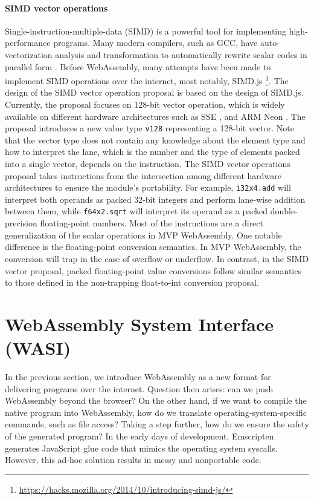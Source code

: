 \paragraph{SIMD vector operations}
Single-instruction-multiple-data (SIMD) is a powerful tool for implementing
high-performance programs. Many modern compilers, such as GCC, have
auto-vectorization analysis and transformation to automatically rewrite scalar
codes in parallel form \cite{auto-vec-gcc}. Before WebAssembly, many attempts
have been made to implement SIMD operations over the internet, most notably,
SIMD.js \footnote{\url{https://hacks.mozilla.org/2014/10/introducing-simd-js/}}.
The design of the SIMD vector operation proposal is based on the design of
SIMD.js. Currently, the proposal focuses on 128-bit vector operation, which is
widely available on different hardware architectures such as SSE
\cite{sse-intel}, and ARM Neon \cite{arm-neon}. The proposal introduces a new
value type \texttt{v128} representing a 128-bit vector. Note that the vector
type does not contain any knowledge about the element type and how to interpret
the lane, which is the number and the type of elements packed into a single
vector, depends on the instruction. The SIMD vector operations proposal takes
instructions from the intersection among different hardware architectures to
ensure the module's portability. For example, \texttt{i32x4.add} will interpret
both operands as packed 32-bit integers and perform lane-wise addition between
them, while \texttt{f64x2.sqrt} will interpret its operand as a packed
double-precision floating-point numbers. Most of the instructions are a direct
generalization of the scalar operations in MVP WebAssembly. One notable
difference is the floating-point conversion semantics. In MVP WebAssembly, the
conversion will trap in the case of overflow or underflow. In contrast, in the
SIMD vector proposal, packed floating-point value conversions follow similar
semantics to those defined in the non-trapping float-to-int conversion proposal.

\section{WebAssembly System Interface (WASI)}

In the previous section, we introduce WebAssembly as a new format for delivering
programs over the internet. Question then arises: can we push WebAssembly beyond
the browser? On the other hand, if we want to compile the native program into
WebAssembly, how do we translate operating-system-specific commands, such as
file access? Taking a step further, how do we ensure the safety of the generated
program? In the early days of development, Emscripten generates JavaScript glue
code that mimics the operating system syscalls. However, this ad-hoc solution
results in messy and nonportable code.

